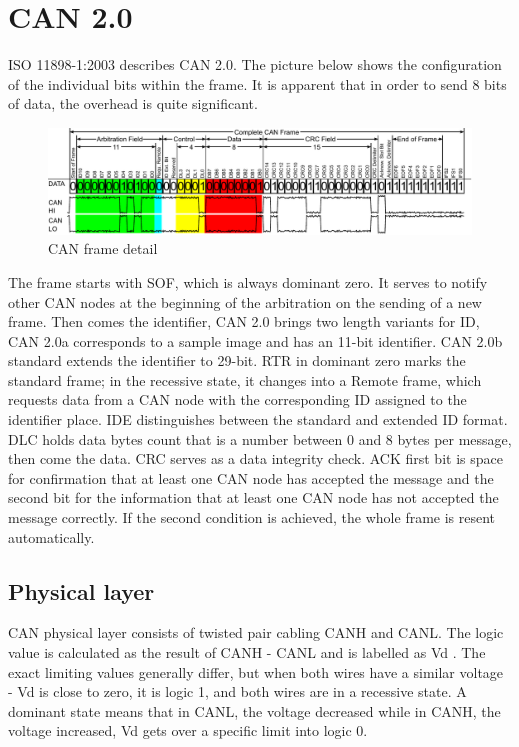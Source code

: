 \documentclass{ctuthesis}
\begin{document}
 \section{CAN 2.0}
  ISO 11898-1:2003 describes CAN 2.0. The picture below shows the configuration of the individual bits within the frame. It is apparent that in order to send 8 bits of data, the overhead is quite significant. 
  \begin{figure}[H]
  \includegraphics[width=1\textwidth]{CAN-Bus-frame_in_base_format_without_stuffbits}
  \caption{CAN frame detail \cite{can_frame}}
  \end{figure}
  The frame starts with SOF, which is always dominant zero. It serves to notify other CAN nodes at the beginning of the arbitration on the sending of a new frame. Then comes the identifier, CAN 2.0 brings two length variants for ID, CAN 2.0a corresponds to a sample image and has an 11-bit identifier. CAN 2.0b standard extends the identifier to 29-bit. RTR in dominant zero marks the standard frame; in the recessive state, it changes into a Remote frame, which requests data from a CAN node with the corresponding ID assigned to the identifier place. IDE distinguishes between the standard and extended ID format. DLC holds data bytes count that is a number between 0 and 8 bytes per message, then come the data. CRC serves as a data integrity check. ACK first bit is space for confirmation that at least one CAN node has accepted the message and the second bit for the information that at least one CAN node has not accepted the message correctly. If the second condition is achieved, the whole frame is resent automatically.
  \subsection{Physical layer}
   CAN physical layer consists of twisted pair cabling CANH and CANL. The logic value is calculated as the result of CANH - CANL and is labelled as Vd \cite{can_Vd}. The exact limiting values generally differ, but when both wires have a similar voltage - Vd is close to zero, it is logic 1, and both wires are in a recessive state. A dominant state means that in CANL, the voltage decreased while in CANH, the voltage increased, Vd gets over a specific limit into logic 0.
\end{document}
